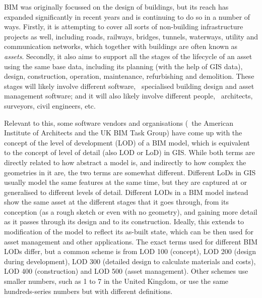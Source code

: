 BIM was originally focussed on the design of buildings, but its reach has expanded significantly in recent years and is continuing to do so in a number of ways.
Firstly, it is attempting to cover all sorts of non-building infrastructure projects as well, including roads, railways, bridges, tunnels, waterways, utility and communication networks, which together with buildings are often known as \emph{assets}.
Secondly, it also aims to support all the stages of the lifecycle of an asset using the same base data, including its planning (with the help of GIS data), design, construction, operation, maintenance, refurbishing and demolition.
These stages will likely involve different software, \eg\ specialised building design and asset management software; and it will also likely involve different people, \eg\ architects, surveyors, civil engineers, etc.

Relevant to this, some software vendors and organisations (\eg\ the American Institute of Architects and the UK BIM Task Group) have come up with the concept of the level of development (LOD) of a BIM model, which is equivalent to the concept of level of detail (also LOD or LoD) in GIS\@.
While both terms are directly related to how abstract a model is, and indirectly to how complex the geometries in it are, the two terms are somewhat different.
Different LoDs in GIS usually model the same features at the same time, but they are captured at or generalised to different levels of detail.
Different LODs in a BIM model instead show the same asset at the different stages that it goes through, from its conception (as a rough sketch or even with no geometry), and gaining more detail as it passes through its design and to its construction.
Ideally, this extends to modification of the model to reflect its as-built state, which can be then used for asset management and other applications.
The exact terms used for different BIM LODs differ, but a common scheme is from LOD 100 (concept), LOD 200 (design during development), LOD 300 (detailed design to calculate materials and costs), LOD 400 (construction) and LOD 500 (asset management).
Other schemes use smaller numbers, such as 1 to 7 in the United Kingdom, or use the same hundreds-series numbers but with different definitions.

